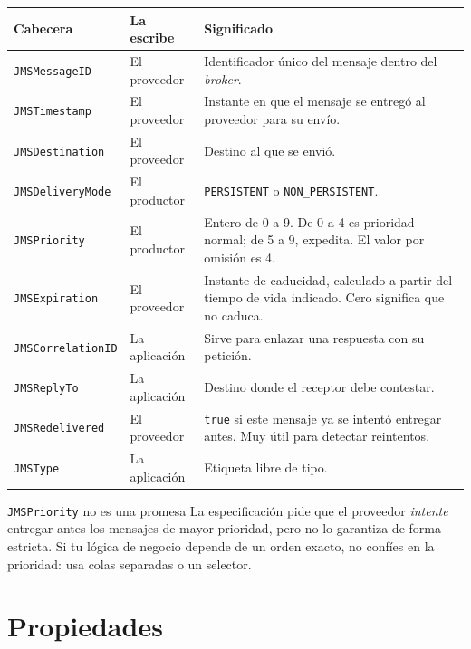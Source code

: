 \documentclass[11pt,a4paper]{book}
\begin{document}
\begin{center}
	\small
	\begin{tabularx}{\textwidth}{@{}p{3.9cm}p{2.0cm}X@{}}
		\toprule
		\textbf{Cabecera} & \textbf{La escribe} & \textbf{Significado} \\
		\midrule
		\texttt{JMSMessageID}     & El proveedor  & Identificador único del mensaje dentro del \emph{broker}. \\
		\texttt{JMSTimestamp}     & El proveedor  & Instante en que el mensaje se entregó al proveedor para su envío. \\
		\texttt{JMSDestination}   & El proveedor  & Destino al que se envió. \\
		\texttt{JMSDeliveryMode}  & El productor  & \texttt{PERSISTENT} o \texttt{NON\_PERSISTENT}. \\
		\texttt{JMSPriority}      & El productor  & Entero de 0 a 9. De 0 a 4 es prioridad normal; de 5 a 9, expedita. El valor por omisión es 4. \\
		\texttt{JMSExpiration}    & El proveedor  & Instante de caducidad, calculado a partir del tiempo de vida indicado. Cero significa que no caduca. \\
		\texttt{JMSCorrelationID} & La aplicación & Sirve para enlazar una respuesta con su petición. \\
		\texttt{JMSReplyTo}       & La aplicación & Destino donde el receptor debe contestar. \\
		\texttt{JMSRedelivered}   & El proveedor  & \texttt{true} si este mensaje ya se intentó entregar antes. Muy útil para detectar reintentos. \\
		\texttt{JMSType}          & La aplicación & Etiqueta libre de tipo. \\
		\bottomrule
	\end{tabularx}
\end{center}

\begin{cajaTip}{\texttt{JMSPriority} no es una promesa}
	La especificación pide que el proveedor \emph{intente} entregar antes los mensajes de mayor prioridad, pero no lo garantiza de forma estricta.
	Si tu lógica de negocio depende de un orden exacto, no confíes en la prioridad: usa colas separadas o un selector.
\end{cajaTip}

\section{Propiedades}
\end{document}

